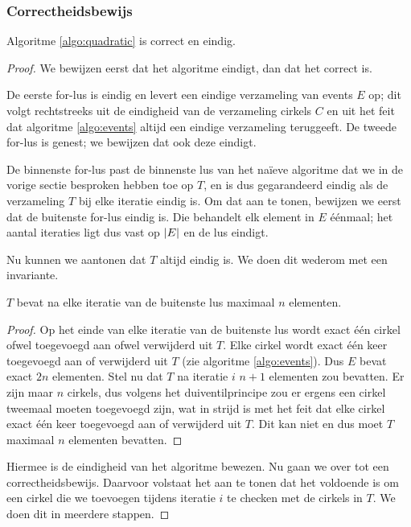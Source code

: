 \subsubsection{Correctheidsbewijs}
\begin{stl} 
  Algoritme \ref{algo:quadratic} is correct en eindig.
  \label{thm:quadratic}
\end{stl}
\begin{proof}
We bewijzen eerst dat het algoritme eindigt, dan dat het correct
is. 

De eerste for-lus is eindig en levert een eindige verzameling van
events $E$ op; dit volgt rechtstreeks uit de eindigheid van de
verzameling cirkels $C$ en uit het feit dat algoritme
\ref{algo:events} altijd een eindige verzameling teruggeeft. De tweede
for-lus is genest; we bewijzen dat ook deze eindigt.

De binnenste for-lus past de binnenste lus van het na\"ieve algoritme
dat we in de vorige sectie besproken hebben toe op $T$, en is dus
gegarandeerd eindig als de verzameling $T$ bij elke iteratie eindig
is. Om dat aan te tonen, bewijzen we eerst dat de buitenste for-lus
eindig is.  Die behandelt elk element in $E$ \'e\'enmaal; het aantal
iteraties ligt dus vast op $\left|E\right|$ en de lus eindigt.

Nu kunnen we aantonen dat $T$ altijd eindig is. We doen dit wederom
met een invariante.

\begin{inv}
$T$ bevat na elke iteratie van de buitenste lus maximaal $n$ elementen.
\end{inv}

\begin{proof}
Op het einde van elke iteratie van de buitenste lus wordt exact
\'e\'en cirkel ofwel toegevoegd aan ofwel verwijderd uit $T$. Elke
cirkel wordt exact \'e\'en keer toegevoegd aan of verwijderd uit $T$
(zie algoritme \ref{algo:events}). Dus $E$ bevat exact $2n$
elementen. Stel nu dat $T$ na iteratie $i$ $n + 1$ elementen zou
bevatten. Er zijn maar $n$ cirkels, dus volgens het duiventilprincipe
zou er ergens een cirkel tweemaal moeten toegevoegd zijn, wat in
strijd is met het feit dat elke cirkel exact \'e\'en keer
toegevoegd aan of verwijderd uit $T$. Dit kan niet en dus moet $T$
maximaal $n$ elementen bevatten. 
\end{proof} 

Hiermee is de eindigheid van het algoritme bewezen. Nu gaan we over
tot een correctheidsbewijs. Daarvoor volstaat het aan te tonen dat het
voldoende is om een cirkel die we toevoegen tijdens iteratie $i$ te
checken met de cirkels in $T$. We doen dit in meerdere stappen.


\end{proof}
